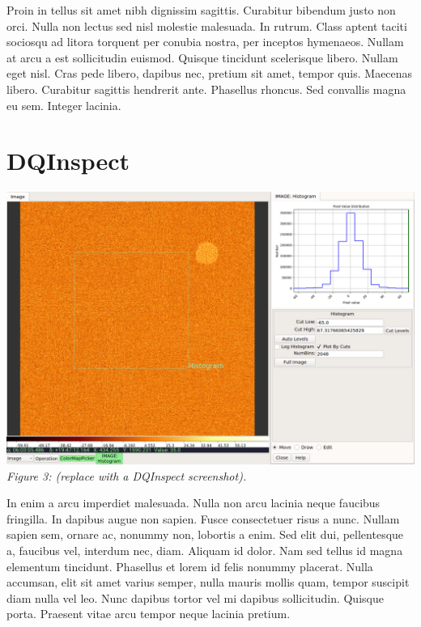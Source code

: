 \documentclass[]{article}
\begin{document}
\begin{multicols}{3}
\para
Proin in tellus sit amet nibh dignissim sagittis. Curabitur bibendum
justo non orci. Nulla non lectus sed nisl molestie malesuada. In
rutrum. Class aptent taciti sociosqu ad litora torquent per conubia
nostra, per inceptos hymenaeos. Nullam at arcu a est sollicitudin
euismod. Quisque tincidunt scelerisque libero. Nullam eget nisl. Cras
pede libero, dapibus nec, pretium sit amet, tempor quis. Maecenas
libero. Curabitur sagittis hendrerit ante. Phasellus rhoncus. Sed
convallis magna eu sem. Integer lacinia. 

\section*{DQInspect}

\para
\begin{center}
\includegraphics[width=8in]{plugin_histogram} \\
\vspace*{0.4em}
\label{fig:plugin_histogram}
{\small\em Figure 3: (replace with a DQInspect screenshot).} 
\end{center}

\para
In enim a arcu imperdiet malesuada. Nulla non arcu lacinia neque
faucibus fringilla. In dapibus augue non sapien. Fusce consectetuer
risus a nunc. Nullam sapien sem, ornare ac, nonummy non, lobortis a
enim. Sed elit dui, pellentesque a, faucibus vel, interdum nec,
diam. Aliquam id dolor. Nam sed tellus id magna elementum
tincidunt. Phasellus et lorem id felis nonummy placerat. Nulla accumsan,
elit sit amet varius semper, nulla mauris mollis quam, tempor suscipit
diam nulla vel leo. Nunc dapibus tortor vel mi dapibus
sollicitudin. Quisque porta. Praesent vitae arcu tempor neque lacinia
pretium. 


\end{multicols}
\end{document}
